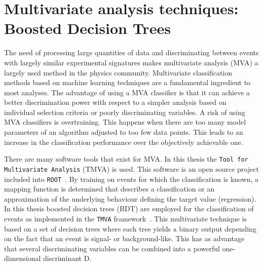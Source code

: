 \section{Multivariate analysis techniques: Boosted Decision Trees}
\label{sec:BDT}
The need of processing large quantities of data and discriminating between events with largely similar experimental signatures makes multivariate  analysis (MVA) a largely used method in the physics community. Multivariate classification methods based on machine learning techniques are a fundamental ingredient to most analyses. The advantage of using a MVA classifier is that it can achieve a better discrimination power with respect to a simpler analysis based on individual selection criteria or poorly discriminating variables. A risk of using MVA classifiers is overtraining.  This happens when there are too many model parameters of an algorithm adjusted to too few data points. This leads to an increase in the classification performance over the objectively achievable one.

There are many software tools that exist for MVA. In this thesis the \texttt{Tool for Multivariate Analysis} (TMVA) \cite{2007physics3039H} is used. This software is an open source project included into \texttt{ROOT}~\cite{Brun:1997pa}. 
 By training on events for which the classification is known, a mapping function is determined that describes a classification or an approximation of the underlying behaviour defining the target value (regression). In this thesis boosted decision trees (BDT) are employed for the classification of events as implemented in the \texttt{TMVA} framework~\cite{2007physics3039H}. This multivariate technique is based on a set of decision trees where each tree yields a binary output depending on the fact that an event is signal- or background-like. This has as advantage  that several discriminating variables can be combined into a powerful one-dimensional discriminant D. 


